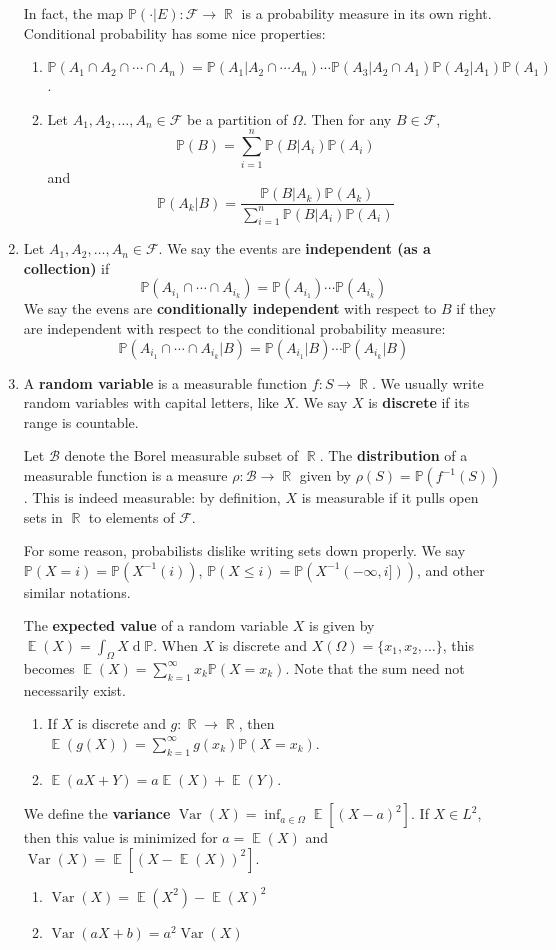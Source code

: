 \documentclass[12pt, a4paper]{article}
\DeclareMathOperator{\R}{\mathbb{R}}
\DeclareMathOperator{\E}{\mathbb{E}}
\DeclareMathOperator{\Var}{Var}
\renewcommand{\Pr}{\mathbb{P}}
\renewcommand{\d}[1]{\ensuremath{\operatorname{d}\!{#1}}} %
\theoremstyle{nonumberplain}
\begin{document}
\begin{enumerate}
        In fact, the map $\Pr(\cdot|E):\mathcal{F}\to\R$ is a probability measure in its own right.
        Conditional probability has some nice properties:
        \begin{enumerate}
            \item $\Pr(A_1\cap A_2\cap\cdots\cap A_n)=\Pr(A_1|A_2\cap\cdots A_n)\cdots\Pr(A_3|A_2\cap A_1)\Pr(A_2|A_1)\Pr(A_1)$.
            \item Let $A_1,A_2,\ldots,A_n\in\mathcal{F}$ be a partition of $\Omega$.
                Then for any $B\in\mathcal{F}$,
                \[\Pr(B)=\sum\limits_{i=1}^n\Pr(B|A_i)\Pr(A_i)\]
                and
                \[\Pr(A_k|B)=\frac{\Pr(B|A_k)\Pr(A_k)}{\sum\limits_{i=1}^n\Pr(B|A_i)\Pr(A_i)}\]
        \end{enumerate}
    \item Let $A_1,A_2,\ldots,A_n\in\mathcal{F}$.
        We say the events are \textbf{independent (as a collection)} if
        \[\Pr(A_{i_1}\cap\cdots\cap A_{i_k})=\Pr(A_{i_1})\cdots\Pr(A_{i_k})\]
        We say the evens are \textbf{conditionally independent} with respect to $B$ if they are independent with respect to the conditional probability measure:
        \[\Pr(A_{i_1}\cap\cdots\cap A_{i_k}|B)=\Pr(A_{i_1}|B)\cdots\Pr(A_{i_k}|B)\]
    \item A \textbf{random variable} is a measurable function $f:S\to\R$.
        We usually write random variables with capital letters, like $X$.
        We say $X$ is \textbf{discrete} if its range is countable.

        Let $\mathcal{B}$ denote the Borel measurable subset of $\R$.
        The \textbf{distribution} of a measurable function is a measure $\rho:\mathcal{B}\to\R$ given by $\rho(S)=\Pr(f^{-1}(S))$.
        This is indeed measurable: by definition, $X$ is measurable if it pulls open sets in $\R$ to elements of $\mathcal{F}$.

        For some reason, probabilists dislike writing sets down properly.
        We say $\Pr(X=i)=\Pr(X^{-1}(i))$, $\Pr(X\leq i)=\Pr(X^{-1}(-\infty,i]))$, and other similar notations.

        The \textbf{expected value} of a random variable $X$ is given by $\E(X)=\int_\Omega X\d{\Pr}$.
        When $X$ is discrete and $X(\Omega)=\{x_1,x_2,\ldots\}$, this becomes $\E(X)=\sum\limits_{k=1}^\infty x_k\Pr(X=x_k)$.
        Note that the sum need not necessarily exist.
        \begin{enumerate}
            \item If $X$ is discrete and $g:\R\to\R$, then $\E(g(X))=\sum\limits_{k=1}^\infty g(x_k)\Pr(X=x_k)$.
            \item $\E(aX+Y)=a\E(X)+\E(Y)$.
        \end{enumerate}
        We define the \textbf{variance} $\Var(X)=\inf_{a\in\Omega}\E[(X-a)^2]$.
        If $X\in L^2$, then this value is minimized for $a=\E(X)$ and $\Var(X)=\E[(X-\E(X))^2]$.
        \begin{enumerate}
            \item $\Var(X)=\E(X^2)-\E(X)^2$
            \item $\Var(aX+b)=a^2\Var(X)$
        \end{enumerate}
\end{enumerate}
\end{document}
